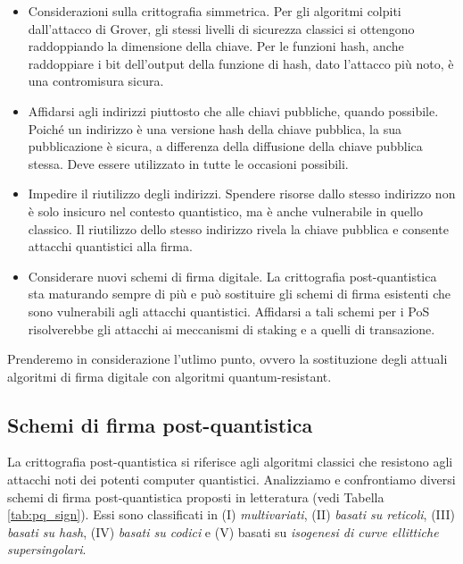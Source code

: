 \begin{itemize}
  \item Considerazioni sulla crittografia simmetrica. Per gli algoritmi colpiti dall'attacco di Grover, gli stessi livelli di sicurezza classici si ottengono raddoppiando la dimensione della chiave. Per le funzioni hash, anche raddoppiare i bit dell'output della funzione di hash, dato l'attacco più noto, è una contromisura sicura.
  \item Affidarsi agli indirizzi piuttosto che alle chiavi pubbliche, quando possibile. Poiché un indirizzo è una versione hash della chiave pubblica, la sua pubblicazione è sicura, a differenza della diffusione della chiave pubblica stessa. Deve essere utilizzato in tutte le occasioni possibili.
  \item Impedire il riutilizzo degli indirizzi. Spendere risorse dallo stesso indirizzo non è solo insicuro nel contesto quantistico, ma è anche vulnerabile in quello classico. Il riutilizzo dello stesso indirizzo rivela la chiave pubblica e consente attacchi quantistici alla firma.
  \item Considerare nuovi schemi di firma digitale. La crittografia post-quantistica sta maturando sempre di più e può sostituire gli schemi di firma esistenti che sono vulnerabili agli attacchi quantistici. Affidarsi a tali schemi per i PoS risolverebbe gli attacchi ai meccanismi di staking e a quelli di transazione.
\end{itemize}

Prenderemo in considerazione l'utlimo punto, ovvero la sostituzione degli attuali algoritmi di firma digitale con algoritmi quantum-resistant.

\subsection{Schemi di firma post-quantistica}
La crittografia post-quantistica si riferisce agli algoritmi classici che resistono agli attacchi noti dei potenti computer quantistici. Analizziamo e confrontiamo diversi schemi di firma post-quantistica proposti in letteratura (vedi Tabella \ref{tab:pq_sign}). Essi sono classificati in (I) \textit{multivariati}, (II) \textit{basati su reticoli}, (III) \textit{basati su hash}, (IV) \textit{basati su codici} e (V) basati su \textit{isogenesi di curve ellittiche supersingolari}.

